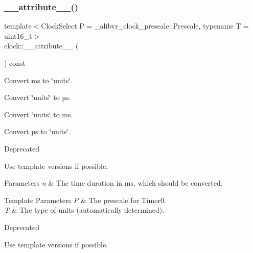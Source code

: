 \subsubsection{\texorpdfstring{\+\_\+\+\_\+attribute\+\_\+\+\_\+()}{\_\_attribute\_\_()}\hspace{0.1cm}{\footnotesize\ttfamily [2/2]}}
{\footnotesize\ttfamily template$<$Clock\+Select P = \+\_\+alibvr\+\_\+clock\+\_\+prescale\+::\+Prescale, typename T  = uint16\+\_\+t$>$ \\
clock\+::\+\_\+\+\_\+attribute\+\_\+\+\_\+ (\begin{DoxyParamCaption}\item[{(deprecated(\char`\"{}If possible use the template version.  \char`\"{} \char`\"{}This function probably bloats your code and might be very slow\char`\"{}))}]{ }\end{DoxyParamCaption}) const}



Convert ms to \char`\"{}units\char`\"{}. 

Convert \char`\"{}units\char`\"{} to µs.

Convert \char`\"{}units\char`\"{} to ms.

Convert µs to \char`\"{}units\char`\"{}.

\begin{DoxyRefDesc}{Deprecated}
\item[\hyperlink{deprecated__deprecated000003}{Deprecated}]Use template versions if possible.\end{DoxyRefDesc}



\begin{DoxyParams}{Parameters}
{\em n} & The time duration in ms, which should be converted. \\
\hline
\end{DoxyParams}

\begin{DoxyTemplParams}{Template Parameters}
{\em P} & The prescale for {\ttfamily Timer0}. \\
\hline
{\em T} & The type of units (automatically determined).\\
\hline
\end{DoxyTemplParams}
\begin{DoxyRefDesc}{Deprecated}
\item[\hyperlink{deprecated__deprecated000004}{Deprecated}]Use template versions if possible.\end{DoxyRefDesc}



